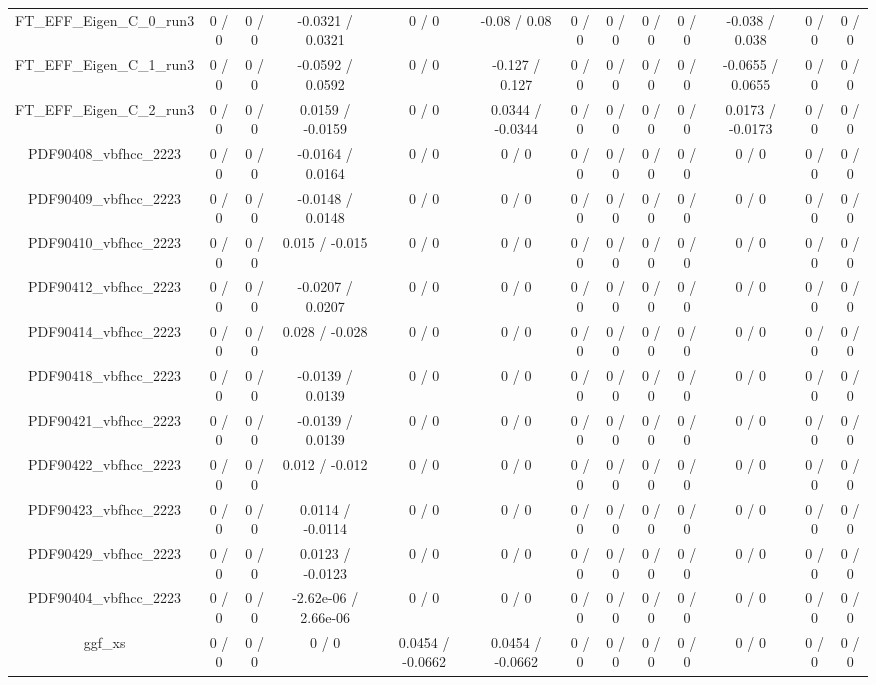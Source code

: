 \documentclass[10pt]{article}
\begin{document}
\begin{table}[htbp]
\begin{center}
\begin{tabular}{|c|c|c|c|c|c|c|c|c|c|c|c|c|}
  FT_EFF_Eigen_C_0_run3 & 0 / 0 & 0 / 0 & -0.0321 / 0.0321 & 0 / 0 & -0.08 / 0.08 & 0 / 0 & 0 / 0 & 0 / 0 & 0 / 0 & -0.038 / 0.038 & 0 / 0 & 0 / 0 \\ 
  FT_EFF_Eigen_C_1_run3 & 0 / 0 & 0 / 0 & -0.0592 / 0.0592 & 0 / 0 & -0.127 / 0.127 & 0 / 0 & 0 / 0 & 0 / 0 & 0 / 0 & -0.0655 / 0.0655 & 0 / 0 & 0 / 0 \\ 
  FT_EFF_Eigen_C_2_run3 & 0 / 0 & 0 / 0 & 0.0159 / -0.0159 & 0 / 0 & 0.0344 / -0.0344 & 0 / 0 & 0 / 0 & 0 / 0 & 0 / 0 & 0.0173 / -0.0173 & 0 / 0 & 0 / 0 \\ 
  PDF90408_vbfhcc_2223 & 0 / 0 & 0 / 0 & -0.0164 / 0.0164 & 0 / 0 & 0 / 0 & 0 / 0 & 0 / 0 & 0 / 0 & 0 / 0 & 0 / 0 & 0 / 0 & 0 / 0 \\ 
  PDF90409_vbfhcc_2223 & 0 / 0 & 0 / 0 & -0.0148 / 0.0148 & 0 / 0 & 0 / 0 & 0 / 0 & 0 / 0 & 0 / 0 & 0 / 0 & 0 / 0 & 0 / 0 & 0 / 0 \\ 
  PDF90410_vbfhcc_2223 & 0 / 0 & 0 / 0 & 0.015 / -0.015 & 0 / 0 & 0 / 0 & 0 / 0 & 0 / 0 & 0 / 0 & 0 / 0 & 0 / 0 & 0 / 0 & 0 / 0 \\ 
  PDF90412_vbfhcc_2223 & 0 / 0 & 0 / 0 & -0.0207 / 0.0207 & 0 / 0 & 0 / 0 & 0 / 0 & 0 / 0 & 0 / 0 & 0 / 0 & 0 / 0 & 0 / 0 & 0 / 0 \\ 
  PDF90414_vbfhcc_2223 & 0 / 0 & 0 / 0 & 0.028 / -0.028 & 0 / 0 & 0 / 0 & 0 / 0 & 0 / 0 & 0 / 0 & 0 / 0 & 0 / 0 & 0 / 0 & 0 / 0 \\ 
  PDF90418_vbfhcc_2223 & 0 / 0 & 0 / 0 & -0.0139 / 0.0139 & 0 / 0 & 0 / 0 & 0 / 0 & 0 / 0 & 0 / 0 & 0 / 0 & 0 / 0 & 0 / 0 & 0 / 0 \\ 
  PDF90421_vbfhcc_2223 & 0 / 0 & 0 / 0 & -0.0139 / 0.0139 & 0 / 0 & 0 / 0 & 0 / 0 & 0 / 0 & 0 / 0 & 0 / 0 & 0 / 0 & 0 / 0 & 0 / 0 \\ 
  PDF90422_vbfhcc_2223 & 0 / 0 & 0 / 0 & 0.012 / -0.012 & 0 / 0 & 0 / 0 & 0 / 0 & 0 / 0 & 0 / 0 & 0 / 0 & 0 / 0 & 0 / 0 & 0 / 0 \\ 
  PDF90423_vbfhcc_2223 & 0 / 0 & 0 / 0 & 0.0114 / -0.0114 & 0 / 0 & 0 / 0 & 0 / 0 & 0 / 0 & 0 / 0 & 0 / 0 & 0 / 0 & 0 / 0 & 0 / 0 \\ 
  PDF90429_vbfhcc_2223 & 0 / 0 & 0 / 0 & 0.0123 / -0.0123 & 0 / 0 & 0 / 0 & 0 / 0 & 0 / 0 & 0 / 0 & 0 / 0 & 0 / 0 & 0 / 0 & 0 / 0 \\ 
  PDF90404_vbfhcc_2223 & 0 / 0 & 0 / 0 & -2.62e-06 / 2.66e-06 & 0 / 0 & 0 / 0 & 0 / 0 & 0 / 0 & 0 / 0 & 0 / 0 & 0 / 0 & 0 / 0 & 0 / 0 \\ 
  ggf_xs & 0 / 0 & 0 / 0 & 0 / 0 & 0.0454 / -0.0662 & 0.0454 / -0.0662 & 0 / 0 & 0 / 0 & 0 / 0 & 0 / 0 & 0 / 0 & 0 / 0 & 0 / 0 \\ 

\end{tabular}
\end{center}
\end{table}
\end{document}
